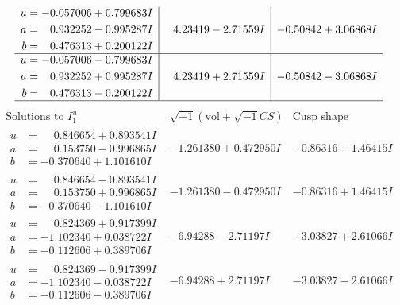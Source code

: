 \documentclass[1p]{elsarticle_modified}
\theoremstyle{definition}
\newcommand{\I}{\sqrt{-1}}
\begin{document}
$$\begin{array}{c|c|c}
\begin{aligned}
u &= -0.057006 + 0.799683 I \\
a &= \phantom{-}0.932252 - 0.995287 I \\
b &= \phantom{-}0.476313 + 0.200122 I\end{aligned}
 & \phantom{-}4.23419 - 2.71559 I & -0.50842 + 3.06868 I \\ \hline\begin{aligned}
u &= -0.057006 - 0.799683 I \\
a &= \phantom{-}0.932252 + 0.995287 I \\
b &= \phantom{-}0.476313 - 0.200122 I\end{aligned}
 & \phantom{-}4.23419 + 2.71559 I & -0.50842 - 3.06868 I\\
 \hline 
 \end{array}$$\newpage$$\begin{array}{c|c|c}  
\text{Solutions to }I^u_{1}& \I (\text{vol} + \sqrt{-1}CS) & \text{Cusp shape}\\
 \hline 
\begin{aligned}
u &= \phantom{-}0.846654 + 0.893541 I \\
a &= \phantom{-}0.153750 - 0.996865 I \\
b &= -0.370640 + 1.101610 I\end{aligned}
 & -1.261380 + 0.472950 I & -0.86316 - 1.46415 I \\ \hline\begin{aligned}
u &= \phantom{-}0.846654 - 0.893541 I \\
a &= \phantom{-}0.153750 + 0.996865 I \\
b &= -0.370640 - 1.101610 I\end{aligned}
 & -1.261380 - 0.472950 I & -0.86316 + 1.46415 I \\ \hline\begin{aligned}
u &= \phantom{-}0.824369 + 0.917399 I \\
a &= -1.102340 + 0.038722 I \\
b &= -0.112606 + 0.389706 I\end{aligned}
 & -6.94288 - 2.71197 I & -3.03827 + 2.61066 I \\ \hline\begin{aligned}
u &= \phantom{-}0.824369 - 0.917399 I \\
a &= -1.102340 - 0.038722 I \\
b &= -0.112606 - 0.389706 I\end{aligned}
 & -6.94288 + 2.71197 I & -3.03827 - 2.61066 I \\ \hline\begin{aligned}

\end{aligned}
\end{array}$$
\end{document}

